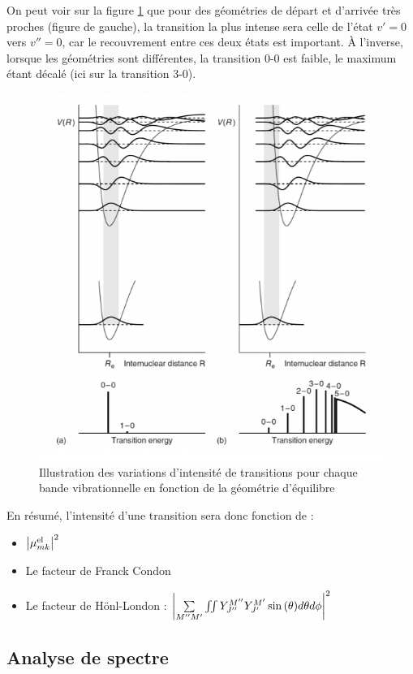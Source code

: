 On peut voir sur la figure \ref{fig:recouvrement} que pour des géométries de départ et d'arrivée très proches (figure de gauche), la transition la plus intense sera celle de l'état $v'=0$ vers $v''=0$, car le recouvrement entre ces deux états est important. À l'inverse, lorsque les géométries sont différentes, la transition 0-0 est faible, le maximum étant décalé (ici sur la transition 3-0).
\begin{figure}
\centering
\includegraphics[scale=0.8]{Images3/Recouvrement.PNG}
\caption{Illustration des variations d'intensité de transitions pour chaque bande vibrationnelle en fonction de la géométrie d'équilibre}
\label{fig:recouvrement}
\end{figure}
En résumé, l'intensité d'une transition sera donc fonction de  :
\begin{itemize}
    \item $\abs{\mu_{mk}^\text{el}}^2$
    \item Le facteur de Franck Condon
    \item Le facteur de Hönl-London : $\abs{\sum\limits_{M''M'}\iint Y_{J''}^{M''}Y_{J'}^{M'}\sin{(\theta)}d\theta d\phi}^2$
\end{itemize}


\subsection{Analyse de spectre}


